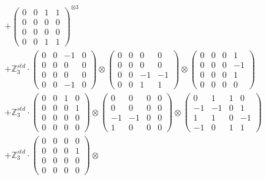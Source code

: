 \documentclass{article}
\begin{document}
{\begin{align}
        &+ \label{Rs16-Rc11-Solution-18-c16} \begin{pmatrix} 0 & 0 & 1 & 1 \\ 0 & 0 & 0 & 0 \\ 0 & 0 & 0 & 0 \\ 0 & 0 & 1 & 1 \end{pmatrix}^{\otimes 3} \\
        &+ \label{Rs16-Rc11-Solution-18-c17} \mathbb{Z}_3^{std} \cdot 
            \begin{pmatrix} 0 & 0 & -1 & 0 \\ 0 & 0 & 0 & 0 \\ 0 & 0 & 0 & 0 \\ 0 & 0 & -1 & 0 \end{pmatrix} \otimes 
            \begin{pmatrix} 0 & 0 & 0 & 0 \\ 0 & 0 & 0 & 0 \\ 0 & 0 & -1 & -1 \\ 0 & 0 & 1 & 1 \end{pmatrix} \otimes 
            \begin{pmatrix} 0 & 0 & 0 & 1 \\ 0 & 0 & 0 & -1 \\ 0 & 0 & 0 & 1 \\ 0 & 0 & 0 & 0 \end{pmatrix} \\ 
        &+ \label{Rs16-Rc11-Solution-18-c18} \mathbb{Z}_3^{std} \cdot 
            \begin{pmatrix} 0 & 0 & 1 & 0 \\ 0 & 0 & 0 & 1 \\ 0 & 0 & 0 & 0 \\ 0 & 0 & 0 & 0 \end{pmatrix} \otimes 
            \begin{pmatrix} 0 & 0 & 0 & 0 \\ 0 & 0 & 0 & 0 \\ -1 & -1 & 0 & 0 \\ 1 & 0 & 0 & 0 \end{pmatrix} \otimes 
            \begin{pmatrix} 0 & 1 & 1 & 0 \\ -1 & -1 & 0 & 1 \\ 1 & 1 & 0 & -1 \\ -1 & 0 & 1 & 1 \end{pmatrix} \\ 
        &+ \label{Rs16-Rc11-Solution-18-c19} \mathbb{Z}_3^{std} \cdot 
            \begin{pmatrix} 0 & 0 & 0 & 0 \\ 0 & 0 & 0 & 1 \\ 0 & 0 & 0 & 0 \\ 0 & 0 & 0 & 0 \end{pmatrix} \otimes 

\end{align}}
\end{document}
